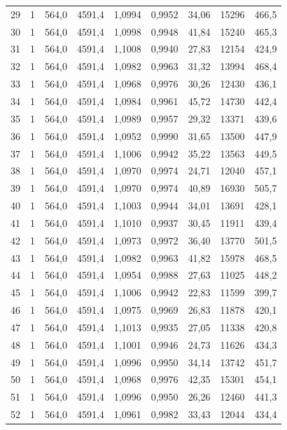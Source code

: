\documentclass[11pt,a4paper]{article}
\begin{document}
{\begin{longtable}{r c r r r r r r r}
29 & 1 & 564,0 & 4591,4 & 1,0994 & 0,9952 & 34,06 & 15296 & 466,5 \\
30 & 1 & 564,0 & 4591,4 & 1,0998 & 0,9948 & 41,84 & 15240 & 465,3 \\
31 & 1 & 564,0 & 4591,4 & 1,1008 & 0,9940 & 27,83 & 12154 & 424,9 \\
32 & 1 & 564,0 & 4591,4 & 1,0982 & 0,9963 & 31,32 & 13994 & 468,4 \\
33 & 1 & 564,0 & 4591,4 & 1,0968 & 0,9976 & 30,26 & 12430 & 436,1 \\
34 & 1 & 564,0 & 4591,4 & 1,0984 & 0,9961 & 45,72 & 14730 & 442,4 \\
35 & 1 & 564,0 & 4591,4 & 1,0989 & 0,9957 & 29,32 & 13371 & 439,6 \\
36 & 1 & 564,0 & 4591,4 & 1,0952 & 0,9990 & 31,65 & 13500 & 447,9 \\
37 & 1 & 564,0 & 4591,4 & 1,1006 & 0,9942 & 35,22 & 13563 & 449,5 \\
38 & 1 & 564,0 & 4591,4 & 1,0970 & 0,9974 & 24,71 & 12040 & 457,1 \\
39 & 1 & 564,0 & 4591,4 & 1,0970 & 0,9974 & 40,89 & 16930 & 505,7 \\
40 & 1 & 564,0 & 4591,4 & 1,1003 & 0,9944 & 34,01 & 13691 & 428,1 \\
41 & 1 & 564,0 & 4591,4 & 1,1010 & 0,9937 & 30,45 & 11911 & 439,4 \\
42 & 1 & 564,0 & 4591,4 & 1,0973 & 0,9972 & 36,40 & 13770 & 501,5 \\
43 & 1 & 564,0 & 4591,4 & 1,0982 & 0,9963 & 41,82 & 15978 & 468,5 \\
44 & 1 & 564,0 & 4591,4 & 1,0954 & 0,9988 & 27,63 & 11025 & 448,2 \\
45 & 1 & 564,0 & 4591,4 & 1,1006 & 0,9942 & 22,83 & 11599 & 399,7 \\
46 & 1 & 564,0 & 4591,4 & 1,0975 & 0,9969 & 26,83 & 11878 & 420,1 \\
47 & 1 & 564,0 & 4591,4 & 1,1013 & 0,9935 & 27,05 & 11338 & 420,8 \\
48 & 1 & 564,0 & 4591,4 & 1,1001 & 0,9946 & 24,73 & 11626 & 434,3 \\
49 & 1 & 564,0 & 4591,4 & 1,0996 & 0,9950 & 34,14 & 13742 & 451,7 \\
50 & 1 & 564,0 & 4591,4 & 1,0968 & 0,9976 & 42,35 & 15301 & 454,1 \\
51 & 1 & 564,0 & 4591,4 & 1,0996 & 0,9950 & 26,26 & 12460 & 441,3 \\
52 & 1 & 564,0 & 4591,4 & 1,0961 & 0,9982 & 33,43 & 12044 & 434,4 \\

\end{longtable}}
\end{document}
